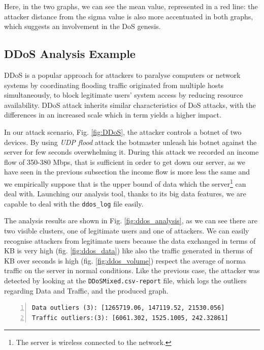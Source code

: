 Here, in the two graphs, we can see the mean value, represented in a red line: the attacker distance from the sigma value is also more accentuated in both graphs, which suggests an involvement in the DoS genesis.

\subsection{DDoS Analysis Example}
DDoS is a popular approach for attackers to paralyse computers or network systems by coordinating flooding traffic originated from multiple hosts simultaneously, to block legitimate users' system access by reducing resource availability. 
DDoS attack inherits similar characteristics of DoS attacks, with the differences in an increased scale which in term yields a higher impact\cite{ddos_forensics}.

In our attack scenario, Fig. \ref{fig:DDoS},  the attacker controls a botnet of two devices.
By using \textit{UDP flood} attack the botmaster unleash his botnet against the server for few seconds overwhelming it. 
During this attack we recorded an income flow of 350-380 Mbps, that is sufficient in order to get down our server, as we have seen in the previous subsection the income flow is more less the same and we empirically suppose that is the upper bound of data which the server\footnote{The server is wireless connected to the network.} can deal with.
Launching our analysis tool, thanks to its big data features, we are capable to deal with the \texttt{ddos\_log} file easily.

The analysis results are shown in Fig. \ref{fig:ddos_analysis}, as we can see there are two  visible clusters, one of legitimate users and one of attackers. 
We can easily recognise attackers from legitimate users because the data exchanged in terms of KB is very high (fig. \ref{fig:ddos_data}) like also the traffic generated in therms of KB over seconds is high (fig. \ref{fig:ddos_volume}) respect the average of norma traffic on the server in normal conditions. 
Like the previous case, the attacker was detected by looking at the \texttt{DDoSMixed.csv-report} file, which logs the outliers regarding Data and Traffic, and the produced graph.

\begin{lstlisting}[numbers=left, columns=flexible, breaklines=false, frame=tb, caption={\textit{DDoSMixed.csv-report} file}, label={lst:DoSMixed.csv-report}]
Data outliers (3): [1265719.06, 147119.52, 21530.056]
Traffic outliers:(3): [6061.302, 1525.1005, 242.32861]
\end{lstlisting}

